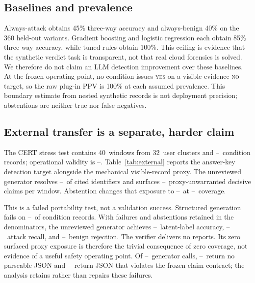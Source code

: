 \documentclass[letterpaper,twocolumn,10pt]{article}
\newcommand{\todoresult}{\textnormal{--}}
\newcommand{\ExternalRecords}{\todoresult}
\newcommand{\ExternalClusters}{32}
\newcommand{\ExternalWindows}{40}
\newcommand{\ExternalOperationalValidity}{\todoresult}
\newcommand{\ExternalOperationalFailure}{\todoresult}
\newcommand{\ExternalGeneratorAttempts}{\todoresult}
\newcommand{\ExternalJSONFailures}{\todoresult}
\newcommand{\ExternalSchemaFailures}{\todoresult}
\newcommand{\ExternalBaseAccuracy}{\todoresult}
\newcommand{\ExternalBaseAttackRecall}{\todoresult}
\newcommand{\ExternalBaseBenignRejection}{\todoresult}
\newcommand{\ExternalBaseUnsafeExposure}{\todoresult}
\newcommand{\ExternalBaseCitationValidity}{\todoresult}
\newcommand{\ExternalAbstainCoverage}{\todoresult}
\newcommand{\ExternalAbstainUnsafeExposure}{\todoresult}
\begin{document}
\subsection{Baselines and prevalence}

Always-attack obtains 45\% three-way accuracy and always-benign 40\% on the 360
held-out variants.  Gradient boosting and logistic regression each obtain 85\%
three-way accuracy, while tuned rules obtain 100\%.  This ceiling is evidence
that the synthetic verdict task is transparent, not that real cloud forensics
is solved.  We therefore do not claim an LLM detection improvement over these
baselines.  At the frozen operating point, no condition issues \textsc{yes} on
a visible-evidence \textsc{no} target, so the raw plug-in PPV is 100\% at each
assumed prevalence.  This boundary estimate from nested synthetic records is
not deployment precision; abstentions are neither true nor false negatives.

\subsection{External transfer is a separate, harder claim}

The CERT stress test contains \ExternalWindows\ windows from
\ExternalClusters\ user clusters and \ExternalRecords\ condition records;
operational validity is \ExternalOperationalValidity.  Table~\ref{tab:external}
reports the answer-key detection target alongside the mechanical visible-record
proxy.  The unreviewed generator resolves \ExternalBaseCitationValidity\ of
cited identifiers and surfaces \ExternalBaseUnsafeExposure\ proxy-unwarranted
decisive claims per window.  Abstention changes that exposure to
\ExternalAbstainUnsafeExposure\ at \ExternalAbstainCoverage\ coverage.

This is a failed portability test, not a validation success.  Structured
generation fails on \ExternalOperationalFailure\ of condition records.  With
failures and abstentions retained in the denominators, the unreviewed generator
achieves \ExternalBaseAccuracy\ latent-label accuracy,
\ExternalBaseAttackRecall\ attack recall, and
\ExternalBaseBenignRejection\ benign rejection.  The verifier delivers no
reports.  Its zero surfaced proxy exposure is therefore the trivial consequence
of zero coverage, not evidence of a useful safety operating point.  Of
\ExternalGeneratorAttempts\ generator calls, \ExternalJSONFailures\ return no
parseable JSON and \ExternalSchemaFailures\ return JSON that violates the
frozen claim contract; the analysis retains rather than repairs these failures.
\end{document}

